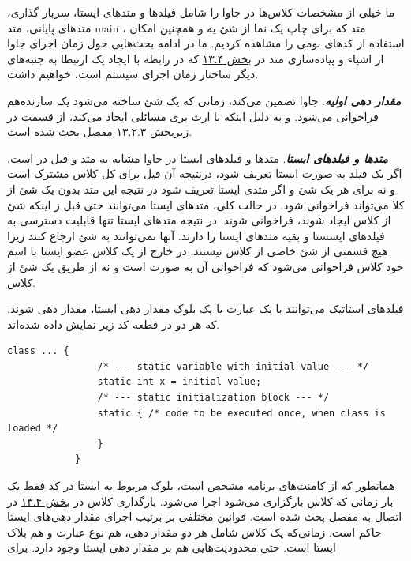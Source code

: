 \documentclass[a4paper,12pt]{report}
\newcommand{\lrm}[1]{\textcolor{steelBlue}{\lr{\texttt{#1}}}}
\begin{document}
	ما خیلی از مشخصات کلاس‌ها در جاوا را شامل فیلد‌ها و متدهای ایستا،  سربار گذاری، متد‌های پایانی، متد main ، متد 
	 که برای چاپ یک نما از شئ یه و همچنین امکان استفاده از کد‌های بومی را مشاهده کردیم. ما در ادامه بحث‌هایی حول زمان اجرای جاوا از اشیاء و پیاده‌سازی متد 
	  در 
	\hyperref[sec4:chap13]{
	بخش ۱۳.۴} که در رابطه با ایجاد یک ارتبطا به جنبه‌های دیگر ساختار زمان اجرای سیستم است، خواهیم داشت.

	\textbf{\textit{
	مقدار دهی اولیه}}. جاوا تضمین می‌کند، زمانی که یک شئ ساخته می‌شود یک سازنده‌هم فراخوانی می‌شود.
	و به دلیل اینکه با ارث ‌بری مسائلی ایجاد می‌کند، از قسمت در 
	\hyperref[subsec3:sec2:chap13]{
	زیربخش ۱۳.۲.۳ } مفصل بحث شده است.
	
	\textit{\textbf{
	متد‌ها و فیلد‌های ایستا}}. متد‌ها و فیلد‌های ایستا در جاوا مشابه به متد و فیل در 
 است. اگر یک فیلد به صورت ایستا تعریف شود، درنتیجه آن فیل برای کل کلاس مشترک است و نه برای هر یک شئ و اگر متدی ایستا تعریف شود در نتیجه این متد بدون یک شئ از کلا می‌تواند فراخوانی شود. در حالت کلی، متد‌های ایستا می‌توانند حتی قبل ز اینکه  شئ از کلاس ایجاد شوند، فراخوانی شوند. در نتیجه متد‌های ایستا تنها قابلیت دسترسی به فیلد‌های ایسستا و بقیه متد‌های ایستا را دارند. آنها نمی‌توانند به شئ 
 ارجاع کنند زیرا هیچ قسمتی از شئ خاصی از کلاس نیستند. در خارج از یک کلاس عضو ایستا با اسم خود کلاس فراخوانی می‌شود که فراخوانی آن به صورت 
	\lrm{class\_name.static\_method(args)}
	است و نه از طریق یک شئ از کلاس.
	
	فیلد‌های استاتیک می‌توانند با یک عبارت یا یک بلوک مقدار ‌دهی ایستا، مقدار دهی شوند. که هر دو در قطعه کد زیر نمایش داده شده‌اند.
	
	\begin{latin}
		\small
		\begin{lstlisting}[]
			class ... {
				/* --- static variable with initial value --- */
				static int x = initial value;
				/* --- static initialization block --- */
				static { /* code to be executed once, when class is loaded */
				}
			}
		\end{lstlisting}
	\end{latin}	
	
	همانطور که از کامنت‌های برنامه مشخص است، بلوک مربوط به ایستا در کد فقط یک بار زمانی که کلاس بارگزاری می‌شود اجرا می‌شود. بارگذاری کلاس در 
	\hyperref[sec4:chap13]{
		بخش ۱۳.۴} در اتصال به 
 مفصل بحث شده است. قوانین مختلفی بر برتیب اجرای مقدار دهی‌های ایستا حاکم است. زمانی‌که یک کلاس شامل هر دو مقدار دهی، هم نوع عبارت و هم بلاک ایستا است. حتی محدودیت‌هایی هم بر مقدار دهی ایستا وجود دارد. برای     
	
\end{document}
